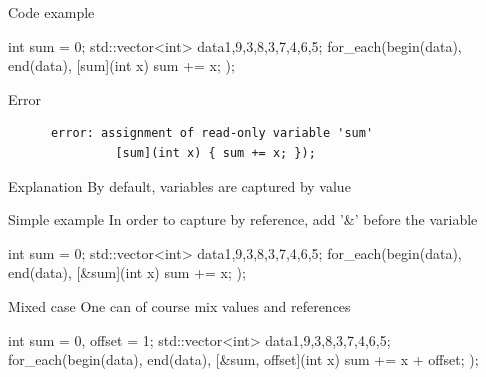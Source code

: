 \begin{frame}[fragile]
  \begin{exampleblock}{Code example}
    \begin{cppcode}
      int sum = 0;
      std::vector<int> data{1,9,3,8,3,7,4,6,5};
      for_each(begin(data), end(data),
              [sum](int x) { sum += x; });
    \end{cppcode}
  \end{exampleblock}
  \pause
  \begin{alertblock}{Error}
    \begin{verbatim}
      error: assignment of read-only variable 'sum'
               [sum](int x) { sum += x; });
    \end{verbatim}
  \end{alertblock}
  \pause
  \begin{block}{Explanation}
    By default, variables are captured by value
  \end{block}
\end{frame}

\begin{frame}[fragile]
  \begin{exampleblock}{Simple example}
    In order to capture by reference, add '\&' before the variable
    \begin{cppcode}
      int sum = 0;
      std::vector<int> data{1,9,3,8,3,7,4,6,5};
      for_each(begin(data), end(data),
              [&sum](int x) { sum += x; });
    \end{cppcode}
  \end{exampleblock}
  \pause
  \begin{exampleblock}{Mixed case}
    One can of course mix values and references
    \begin{cppcode}
      int sum = 0, offset = 1;
      std::vector<int> data{1,9,3,8,3,7,4,6,5};
      for_each(begin(data), end(data),
              [&sum, offset](int x) {
                sum += x + offset;
              });
    \end{cppcode}
  \end{exampleblock}
\end{frame}

